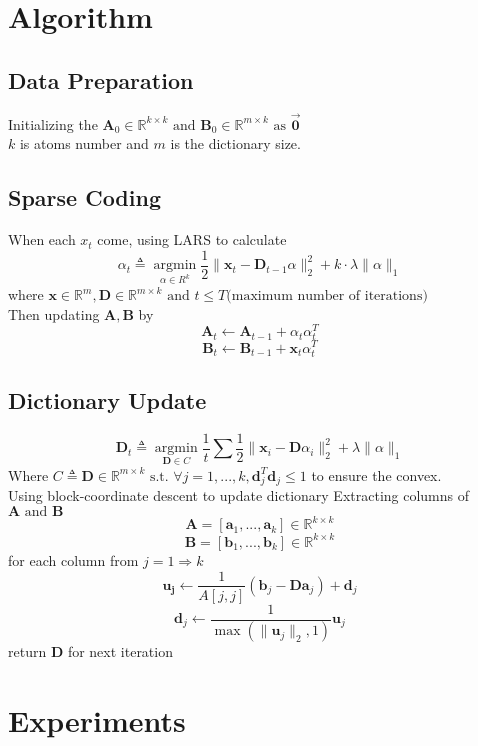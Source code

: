 \documentclass[UTF8]{article}
\begin{document}
\section{Algorithm}

\subsection{Data Preparation}

Initializing the $\bm{A}_0 \in \mathbb{R}^{k \times k} \text{ and } \bm{B}_0 \in \mathbb{R}^{m \times k} \text{ as } \vec{\bm{0}} $\\
$k$ is atoms number and $m$ is the dictionary size.

\subsection{Sparse Coding}
When each $x_t$ come, using LARS\cite{scikit-learn} to calculate
\[
	\alpha_t \triangleq \mathop{\arg\min}\limits_{\alpha\in R^k} \frac{1}{2} \| \bm{x}_t - \bm{D}_{t-1} \alpha  \|^2_2 + k \cdot \lambda \|\alpha\|_1
\]
where $\bm{x} \in \mathbb{R}^{m}, \bm{D} \in \mathbb{R}^{m \times k} \text{ and } t \leq T \text{(maximum number of iterations)}$
\\
Then updating $\bm{A}, \bm{B}$ by
\[\bm{A}_t \leftarrow \bm{A}_{t-1} + \alpha_t \alpha_t^T\]
\[\bm{B}_t \leftarrow \bm{B}_{t-1} + \bm{x}_t \alpha_t^T\]

\subsection{Dictionary Update}
\[\bm{D}_t \triangleq \mathop{\arg\min}\limits_{\bm{D} \in C} \frac{1}{t} \sum{ \frac{1}{2} \| \bm{x}_i - \bm{D} \alpha_i  \|^2_2 + \lambda \|\alpha\|_1}
\]
Where $C \triangleq {\bm{D} \in \mathbb{R}^{m \times k} \text{ s.t. } \forall j = 1, ..., k, \bm{d}_j^T\bm{d}_j \leq 1}$ to ensure the convex.
\\
Using block-coordinate descent to update dictionary
Extracting columns of $\bm{A} \text{ and } \bm{B}$
\[\bm{A} = [\bm{a}_1, ..., \bm{a}_k] \in \mathbb{R}^{k \times k}\]
\[\bm{B} = [\bm{b}_1, ..., \bm{b}_k] \in \mathbb{R}^{k \times k}\]
for each column from $j = 1 \Rightarrow k$
\[\bm{u_j} \leftarrow \frac{1}{A[j, j]}(\bm{b}_j - \bm{Da}_j) + \bm{d}_j\]
\[\bm{d}_j \leftarrow \frac{1}{\max(\|\bm{u}_j\|_2, 1)}\bm{u}_j\]
return $\bm{D}$ for next iteration


\section{Experiments}
\end{document}
